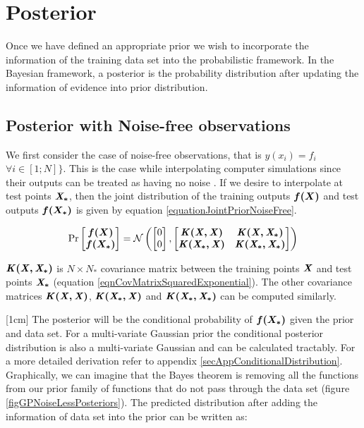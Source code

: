 \section{Posterior}\label{secPosterior}
Once we have defined an appropriate prior we wish to incorporate the information of the training data set into the probabilistic framework. In the Bayesian framework, a posterior is the probability distribution after updating the information of evidence into prior distribution. 


\subsection{Posterior with Noise-free observations}\label{subSecPosteriorNoiseFree}
We first consider the case of noise-free observations, that is $y(x_{i}) = f_{i}$ $ \forall i \in [1; N] \}$. This is the case while interpolating computer simulations since their outputs can be treated as having no noise \cite{sacks1989design}. If we desire to interpolate at test points $\bm{\mathit{X_{*}}}$, then the joint distribution of the training outputs $\boldsymbol{f(X)}$ and test outputs $\boldsymbol{f(X_{*})}$ is given by equation \ref{equationJointPriorNoiseFree}.

\begin{equation}\label{equationJointPriorNoiseFree}
\Pr\left [ \begin{matrix}
\boldsymbol{f(X)}
\\ \boldsymbol{f(X_{*})}
\end{matrix} \right ] = 
\mathcal{N}\left (\left [ \begin{matrix} 0 \\ 0 \end{matrix} \right ]
, 
\left [ \begin{matrix}
\bm{\mathit{K(X, X)}} & \bm{\mathit{K(X, X_{*})}}\\ 
\bm{\mathit{K(X_{*}, X)}} & \bm{\mathit{K(X_{*}, X_{*})}}
\end{matrix} \right ]
\right)
\end{equation}

$\bm{\mathit{K(X, X_{*})}}$ is $N \times N_{*}$ covariance matrix between the training points $\bm{\mathit{X}}$ and test points $\bm{\mathit{X_{*}}}$ (equation \ref{eqnCovMatrixSquaredExponential}). The other covariance matrices $\bm{\mathit{K(X, X)}}$, $\bm{\mathit{K(X_{*}, X)}}$ and $\bm{\mathit{K(X_{*}, X_{*})}}$ can be computed similarly. 

[1cm]
The posterior will be the conditional probability of $\boldsymbol{f(X_{*})}$ given the prior and data set. For a multi-variate Gaussian prior the conditional posterior distribution is also a multi-variate Gaussian and can be calculated tractably. For a more detailed derivation refer to appendix \ref{secAppConditionalDistribution}. Graphically, we can imagine that the Bayes theorem is removing all the functions from our prior family of functions that do not pass through the data set (figure \ref{figGPNoiseLessPosteriors}). The predicted distribution after adding the information of data set into the prior can be written as:

